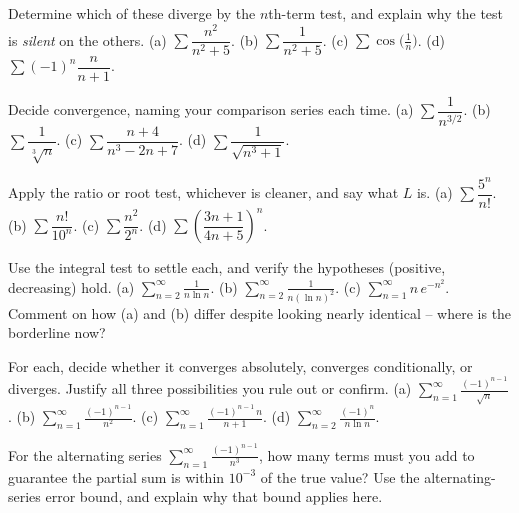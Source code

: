 \begin{exercise}
Determine which of these diverge by the $n$th-term test, and explain why the test is \emph{silent} on the others.
(a) $\sum \dfrac{n^2}{n^2+5}$. \;
(b) $\sum \dfrac{1}{n^2+5}$. \;
(c) $\sum \cos\!\big(\tfrac1n\big)$. \;
(d) $\sum (-1)^n \dfrac{n}{n+1}$.
\end{exercise}

\begin{exercise}
Decide convergence, naming your comparison series each time.
(a) $\sum \dfrac{1}{n^{3/2}}$. \;
(b) $\sum \dfrac{1}{\sqrt[3]{n}}$. \;
(c) $\sum \dfrac{n+4}{n^3 - 2n + 7}$. \;
(d) $\sum \dfrac{1}{\sqrt{n^3+1}}$.
\end{exercise}

\begin{exercise}
Apply the ratio or root test, whichever is cleaner, and say what $L$ is.
(a) $\sum \dfrac{5^n}{n!}$. \;
(b) $\sum \dfrac{n!}{10^n}$. \;
(c) $\sum \dfrac{n^2}{2^n}$. \;
(d) $\sum \left(\dfrac{3n+1}{4n+5}\right)^{n}$.
\end{exercise}

\begin{exercise}
Use the integral test to settle each, and verify the hypotheses (positive, decreasing) hold.
(a) $\displaystyle\sum_{n=2}^\infty \frac{1}{n\ln n}$. \;
(b) $\displaystyle\sum_{n=2}^\infty \frac{1}{n(\ln n)^2}$. \;
(c) $\displaystyle\sum_{n=1}^\infty n\,e^{-n^2}$.
Comment on how (a) and (b) differ despite looking nearly identical -- where is the borderline now?
\end{exercise}

\begin{exercise}
For each, decide whether it converges absolutely, converges conditionally, or diverges. Justify all three possibilities you rule out or confirm.
(a) $\displaystyle\sum_{n=1}^\infty \frac{(-1)^{n-1}}{\sqrt n}$. \;
(b) $\displaystyle\sum_{n=1}^\infty \frac{(-1)^{n-1}}{n^2}$. \;
(c) $\displaystyle\sum_{n=1}^\infty \frac{(-1)^{n-1}\,n}{n+1}$. \;
(d) $\displaystyle\sum_{n=2}^\infty \frac{(-1)^n}{n\ln n}$.
\end{exercise}

\begin{exercise}
For the alternating series $\displaystyle\sum_{n=1}^\infty \frac{(-1)^{n-1}}{n^3}$, how many terms must you add to guarantee the partial sum is within $10^{-3}$ of the true value? Use the alternating-series error bound, and explain why that bound applies here.
\end{exercise}

